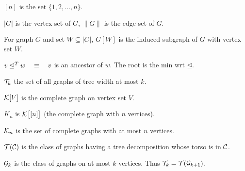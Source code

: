 \documentclass[12pt]{article}
\begin{document}
$[n]$ is the set $\{1, 2, \dots, n\}$.

$\mathopen| G \mathclose|$ is the vertex set of $G$, $\mathopen\| G \mathclose\|$ is the edge set of $G$.

For graph $G$ and set $W \subseteq \mathopen| G \mathclose|$, $G[W]$ is the
induced subgraph of $G$ with vertex set $W$.

$v \unlhd^T w \quad \equiv\quad  v$ is an ancestor of $w$.  The root is the min wrt $\unlhd$.

${\cal T}_k$ the set of all graphs of tree width at most $k$.

${\cal K}[V]$ is the complete graph on vertex set $V$.

$K_n$ is ${\cal K}\bigl[[n]\bigr]$ (the complete graph with $n$ vertices).

${\cal K}_n$ is the set of complete graphs with at most $n$ vertices.

${\cal T(C)}$ is the class of graphs having a tree decomposition whose torso is in ${\cal C}$.

${\cal G}_k$ is the class of graphs on at most $k$ vertices.  Thus ${\cal T}_k = {\cal T}({\cal
  G}_{k+1})$.
\end{document}

